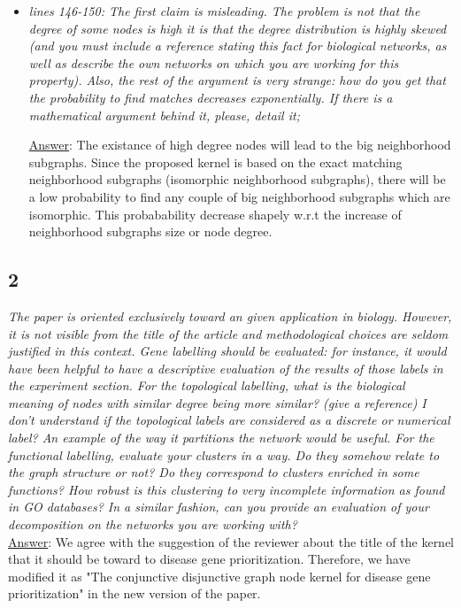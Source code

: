 \documentclass[11pt]{article}
\begin{document}
\begin{itemize}
\item \textit{lines 146-150: The first claim is misleading. The problem is not that the degree of some nodes is high it is that the degree distribution is highly skewed (and you must include a reference stating this fact for biological networks, as well as describe the own networks on which you are working for this property). Also, the rest of the argument is very strange: how do you get that the probability to find matches decreases exponentially. If there is a mathematical argument behind it, please, detail it;}

\underline{Answer}: The existance of high degree nodes will lead to the big neighborhood subgraphs. Since the proposed kernel is based on the exact matching neighborhood subgraphs (isomorphic neighborhood subgraphs), there will be a low probability to find any couple of big neighborhood subgraphs which are isomorphic. This probabability decrease shapely w.r.t the increase of neighborhood subgraphs size or node degree.

\end{itemize}

\subsection*{2} \textit{The paper is oriented exclusively toward an given application in biology. However, it is not visible from the title of the article and methodological choices are seldom justified in this context. Gene labelling should be evaluated: for instance, it would have been helpful to have a descriptive evaluation of the results of those labels in the experiment section. For the topological labelling, what is the biological meaning of nodes with similar degree being more similar? (give a reference) I don't understand if the topological labels are considered as a discrete or numerical label? An example of the way it partitions the network would be useful. For the functional labelling, evaluate your clusters in a way. Do they somehow relate to the graph structure or not? Do they correspond to clusters enriched in some functions? How robust is this clustering to very incomplete information as found in GO databases? In a similar fashion, can you provide an evaluation of your decomposition on the networks you are working with?} \\

\underline{Answer}: We agree with the suggestion of the reviewer about the title of the kernel that it should be toward to disease gene prioritization. Therefore, we have modified it as "The conjunctive disjunctive graph node kernel for disease gene prioritization" in the new version of the paper.\\
\end{document}
